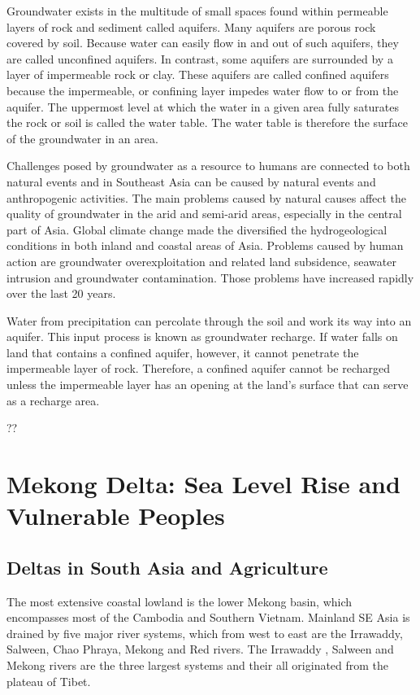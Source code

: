 Groundwater exists in the multitude of small spaces found within permeable layers of rock and sediment called aquifers. Many aquifers are porous rock covered by soil. Because water can easily flow in and out of such aquifers, they are called unconfined aquifers. In contrast, some aquifers are surrounded by a layer of impermeable rock or clay. These aquifers are called confined aquifers because the impermeable, or confining layer impedes water flow to or from the aquifer. The uppermost level at which the water in a given area fully saturates the rock or soil is called the water table. The water table is therefore the surface of the groundwater in an area.
   
Challenges posed by groundwater as a resource to humans are connected to both natural events and in Southeast Asia can be caused by natural events and anthropogenic activities. The main problems caused by natural causes affect the quality of groundwater in the arid and semi-arid areas, especially in the central part of Asia. Global climate change made the diversified the hydrogeological conditions in both inland and coastal areas of Asia. Problems caused by human action are groundwater overexploitation and related land subsidence, seawater intrusion and groundwater contamination. Those problems have increased rapidly over the last 20 years. 
  
Water from precipitation can percolate through the soil and work its way into an aquifer. This input process is known as groundwater recharge. If water falls on land that contains a confined aquifer, however, it cannot penetrate the impermeable layer of rock. Therefore, a confined aquifer cannot be recharged unless the impermeable layer has an opening at the land's surface that can serve as a recharge area. 

\citet{erban2014groundwater}??
    
\section{Mekong Delta: Sea Level Rise and Vulnerable Peoples}

\subsection{Deltas in South Asia and Agriculture}

The most extensive coastal lowland is the lower Mekong basin, which encompasses most of the Cambodia and Southern Vietnam. Mainland SE Asia is drained by five major river systems, which from west to east are the Irrawaddy, Salween, Chao Phraya, Mekong and Red rivers. The Irrawaddy , Salween and Mekong rivers are the three largest systems and their all originated from the plateau of Tibet. 


